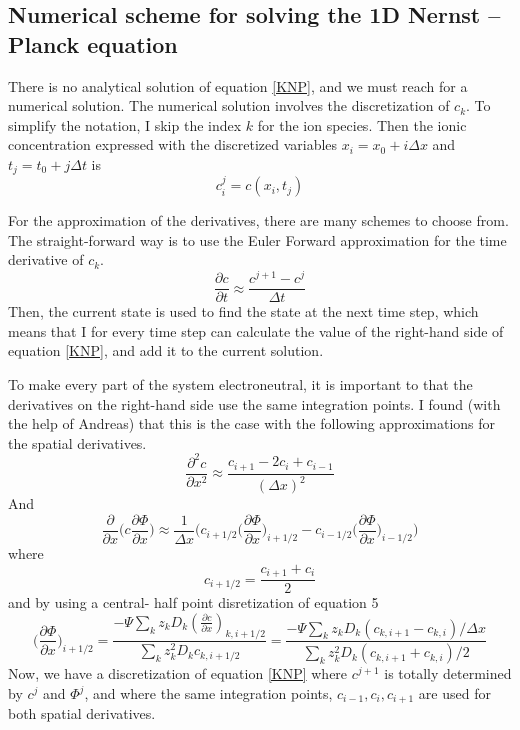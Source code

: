 \documentclass{article}
\begin{document}
\subsection{Numerical scheme for solving the 1D Nernst -- Planck equation}\label{Solving the equation}
There is no analytical solution of equation \ref{KNP}, and we must reach for a numerical solution. The numerical solution involves the discretization of $c_k$. To simplify the notation, I skip the index $k$ for the ion species. Then the ionic concentration expressed with the discretized variables $x_i = x_0 +i \Delta x$ and $t_j = t_0 + j \Delta t$ is 
$$c_i^j = c(x_i, t_j)$$

For the approximation of the derivatives, there are many schemes to choose from. The straight-forward way is to use the Euler Forward approximation for the time derivative of $c_k$.
$$\frac{\partial c}{\partial t} \approx \frac{c^{j+1}-c^j}{\Delta t}$$
Then, the current state is used to find the state at the next time step, which means that I for every time step can calculate the value of the right-hand side of equation \ref{KNP}, and add it to the current solution. 

To make every part of the system electroneutral, it is important to that the derivatives on the right-hand side use the same integration points. I found (with the help of Andreas) that this is the case with the following approximations for the spatial derivatives. 
$$\frac{\partial^2 c}{\partial x^2} \approx \frac{c_{i+1}-2c_i+c_{i-1}}{(\Delta x)^2}$$
And 
$$\frac{\partial }{\partial x}  \bigg(c \frac{\partial \Phi}{\partial x} \bigg)\approx \frac{1}{\Delta x}\bigg( c_{i+1/2} \big(\frac{\partial \Phi}{\partial x}\big)_{i+1/2} -  c_{i-1/2} \big(\frac{\partial \Phi}{\partial x}\big)_{i-1/2} \bigg) $$
where 
$$c_{i+ 1/2} = \frac{c_{i+1}+ c_i}{2}$$
and by using a central- half point disretization of equation 5
\begin{equation}\label{eq:gradPhi}
\big(\frac{\partial \Phi}{\partial x}\big)_{i+1/2} = \frac{-\Psi \sum_k z_k D_k (\frac{\partial c}{\partial x})_{k,i+1/2}}{\sum_k z_k^2 D_k c_{k,i+1/2}}= \frac{-\Psi \sum_k z_k D_k (c_{k,i+1}-c_{k,i})/\Delta x }{\sum_k z_k^2 D_k (c_{k,i+1}+c_{k,i})/2}
\end{equation}
Now, we have a discretization of equation \ref{KNP} where $c^{j+1}$ is totally determined by $c^j$ and $\Phi^j$, and where the same integration points, $c_{i-1}, c_i, c_{i+1}$ are used for both spatial derivatives.  
\end{document}
